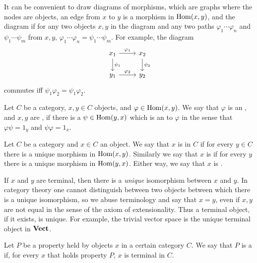 \begin{subsec}
It can be convenient to draw diagrams of morphisms, which are graphs where the nodes are objects, an edge from $x$ to $y$ is a morphism in $\operatorname{Hom}(x, y)$, and the diagram  if for any two objects $x, y$ in the diagram and any two paths $\varphi_{1}\cdots\varphi_{n}$ and $\psi_{1}\cdots\psi_{m}$ from $x, y$, $\varphi_{1}\cdots\varphi_{n} = \psi_{1}\cdots\psi_{m}$.
For example, the diagram
\[\begin{tikzcd}
x_{1} \arrow[r,"\varphi_{1}"] \arrow[d,"\psi_{1}"] & x_{2} \arrow[d,"\psi_{2}"]\\
y_{1} \arrow[r,"\varphi_{2}"] & y_{2}
\end{tikzcd}
\]
commutes iff $\psi_{1}\varphi_{2} = \psi_{1}\varphi_{2}$.
\end{subsec}

\begin{definition}
Let $C$ be a category, $x,y \in C$ objects, and $\varphi \in \operatorname{Hom}(x, y)$.
We say that $\varphi$ is an , and $x,y$ are , if there is a $\psi \in \operatorname{Hom}(y, x)$ which is an  to $\varphi$ in the sense that $\varphi\psi = 1_{y}$ and $\psi\varphi = 1_{x}$.
\end{definition}

\begin{definition}
Let $C$ be a category and $x \in C$ an object.
We say that $x$ is  in $C$ if for every $y \in C$ there is a unique morphism in $\operatorname{Hom}(x, y)$.
Similarly we say that $x$ is  if for every $y$ there is a unique morphism in $\operatorname{Hom}(y, x)$.
Either way, we say that $x$ is .
\end{definition}

\begin{subsec}
If $x$ and $y$ are terminal, then there is a \emph{unique} isomorphism between $x$ and $y$.
In category theory one cannot distinguish between two objects between which there is a unique isomorphism, so we abuse terminology and say that $x = y$, even if $x,y$ are not equal in the sense of the axiom of extensionality.
Thus a terminal object, if it exists, is unique.
For example, the trivial vector space is the unique terminal object in $\mathbf{Vect}$.
\end{subsec}

\begin{definition}
Let $P$ be a property held by objects $x$ in a certain category $C$.
We say that $P$ is a  if, for every $x$ that holds property $P$, $x$ is terminal in $C$.
\end{definition}

